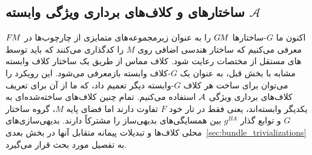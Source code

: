 

\subsection%
[ساختارهای \lr{\textit{G}} \lr{\textit{GM}} و کلاف‌های برداری ویژگی وابسته \texorpdfstring{$\mathcal{A}$}{A}]%
{ساختارهای   و کلاف‌های برداری ویژگی وابسته $\mathcal{A}$}
\label{sec:G_associated_bundles}


اکنون ما $G$-ساختارها $G\mkern-1.4muM$ را به عنوان زیرمجموعه‌های متمایزی از چارچوب‌ها در $F\mkern-1.5muM$ معرفی می‌کنیم که ساختار هندسی اضافی روی $M$ را کدگذاری می‌کنند که باید توسط \CNN های مستقل از مختصات رعایت شود.
کلاف مماس از طریق یک ساختار کلاف وابسته مشابه با بخش قبل، به عنوان یک $G$-کلاف وابسته بازمعرفی می‌شود.
این رویکرد را می‌توان برای ساخت هر کلاف $G$-وابسته دیگر تعمیم داد، که ما از آن برای تعریف کلاف‌های برداری ویژگی $\mathcal{A}$ استفاده می‌کنیم.
تمام چنین کلاف‌های ساخته‌شده‌ای به یکدیگر وابسته‌اند، یعنی فقط در تار خود $F$ تفاوت دارند اما فضای پایه $M$، گروه ساختار $G$ و توابع گذار $g^{BA}$ بین همسایگی‌های بدیهی‌ساز را مشترکاً دارند.
بدیهی‌سازی‌های محلی کلاف‌ها و تبدیلات پیمانه متقابل آنها در بخش بعدی~\ref{sec:bundle_trivializations} به تفصیل مورد بحث قرار می‌گیرد.



